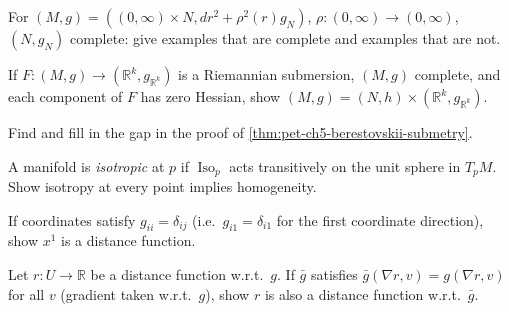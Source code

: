 \begin{remark}
  \label{rem:pet-ch5-ex-11}
  For $(M,g)=((0,\infty)\times N,dr^2+\rho^2(r)g_N)$, $\rho:(0,\infty)\to
  (0,\infty)$, $(N,g_N)$ complete: give examples that are complete and examples
  that are not.
\end{remark}

\begin{remark}
  \label{rem:pet-ch5-ex-12}
  If $F:(M,g)\to(\mathbb R^k,g_{\mathbb R^k})$ is a Riemannian submersion, $(M,g)$
  complete, and each component of $F$ has zero Hessian, show
  $(M,g)=(N,h)\times(\mathbb R^k,g_{\mathbb R^k})$.
\end{remark}

\begin{remark}
  \label{rem:pet-ch5-ex-13}
  Find and fill in the gap in the proof of \cref{thm:pet-ch5-berestovskii-submetry}.
\end{remark}

\begin{remark}
  \label{rem:pet-ch5-ex-14}
  A manifold is \emph{isotropic} at $p$ if $\operatorname{Iso}_p$ acts transitively
  on the unit sphere in $T_pM$. Show isotropy at every point implies homogeneity.
\end{remark}

\begin{remark}
  \label{rem:pet-ch5-ex-15}
  If coordinates satisfy $g_{ii}=\delta_{ij}$ (i.e.\ $g_{i1}=\delta_{i1}$ for the
  first coordinate direction), show $x^1$ is a distance function.
\end{remark}

\begin{remark}
  \label{rem:pet-ch5-ex-16}
  Let $r:U\to\mathbb R$ be a distance function w.r.t.\ $g$. If $\bar g$ satisfies
  $\bar g(\nabla r,v)=g(\nabla r,v)$ for all $v$ (gradient taken w.r.t.\ $g$), show
  $r$ is also a distance function w.r.t.\ $\bar g$.
\end{remark}

